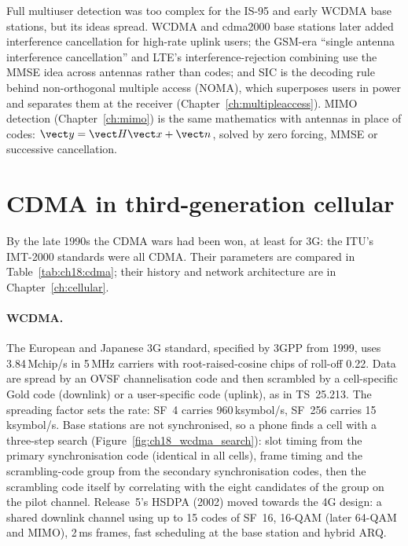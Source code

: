 \begin{inpractice}
Full multiuser detection was too complex for the IS-95 and early WCDMA base stations, but
its ideas spread. WCDMA and cdma2000 base stations later added interference cancellation for
high-rate uplink users; the GSM-era ``single antenna interference cancellation'' and
LTE's interference-rejection combining use the MMSE idea across antennas rather than codes;
and SIC is the decoding rule behind non-orthogonal multiple access (NOMA), which superposes
users in power and separates them at the receiver (Chapter~\ref{ch:multipleaccess}). MIMO
detection (Chapter~\ref{ch:mimo}) is the same mathematics with antennas in place of codes:
$\vect y=\vect H\vect x+\vect n$, solved by zero forcing, MMSE or successive cancellation.
\end{inpractice}

\section{CDMA in third-generation cellular}
\label{sec:ch18:3g}

By the late 1990s the CDMA wars had been won, at least for 3G: the ITU's IMT-2000 standards were
all CDMA. Their parameters are compared in Table~\ref{tab:ch18:cdma}; their history and network
architecture are in Chapter~\ref{ch:cellular}.

\paragraph{WCDMA.} The European and Japanese 3G standard, specified by 3GPP from 1999, uses
3.84\,Mchip/s in 5\,MHz carriers with root-raised-cosine chips of roll-off 0.22. Data are
spread by an OVSF channelisation code and then scrambled by a cell-specific Gold code
(downlink) or a user-specific code (uplink), as in TS~25.213. The spreading factor sets the
rate: SF~4 carries 960\,ksymbol/s, SF~256 carries 15\,ksymbol/s. Base stations are not
synchronised, so a phone finds a cell with a three-step search
(Figure~\ref{fig:ch18_wcdma_search}): slot timing from the primary
synchronisation code (identical in all cells), frame timing and the scrambling-code group
from the secondary synchronisation codes, then the scrambling code itself by correlating with
the eight candidates of the group on the pilot channel. Release~5's HSDPA (2002) moved
towards the 4G design: a shared downlink channel using up to 15 codes of SF~16, 16-QAM
(later 64-QAM and MIMO), 2\,ms frames, fast scheduling at the base station and hybrid ARQ.


